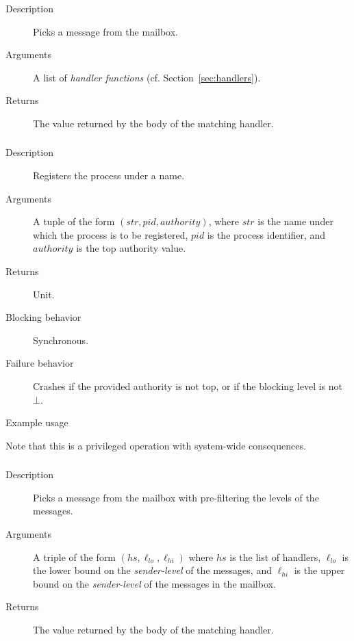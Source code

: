 \subsubsection{}
\begin{description}
    \item [Description] Picks a message from the mailbox.
    \item [Arguments] A list of \emph{handler functions} (cf. Section~\ref{sec:handlers}).
    \item [Returns] The value returned by the body of the matching handler.
\end{description}


\subsubsection{}
\begin{description}
    \item [Description] Registers the process under a name.
    \item [Arguments] A tuple of the form $(\mathit{str}, \mathit{pid}, \mathit{authority})$, where $\mathit{str}$ is the name under
which the process is to be registered, $\mathit{pid}$ is the process identifier, and
$\mathit{authority}$ is the top authority value.
    \item [Returns] Unit.
    \item [Blocking behavior] Synchronous.
    \item [Failure behavior] Crashes if the provided authority is not top, or if the blocking level is not $\bot$.
    \item [Example usage]
\end{description}

Note that this is a privileged operation with system-wide consequences.


\subsubsection{}
\begin{description}
    \item [Description] Picks a message from the mailbox with pre-filtering the levels of the messages.
    \item [Arguments] A triple of the form $(\mathit{hs}, \ell_{\mathit{lo}}, \ell_{\mathit{hi}}) $ where $\mathit{hs}$ is the list of handlers, $\ell_{\mathit{lo}}$ is the lower bound on the \emph{sender-level} of the messages, and
$\ell_{\mathit{hi}}$ is the upper bound on the \emph{sender-level} of the messages in the mailbox.
    \item [Returns] The value returned by the body of the matching handler.
\end{description}


